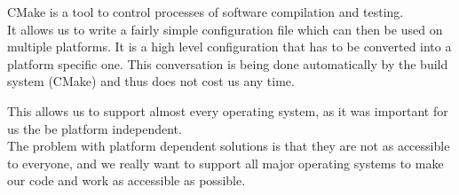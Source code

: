 CMake is a tool to control processes of software compilation and testing. \cite{cmake} \\
It allows us to write a fairly simple configuration file which can then be used on multiple platforms.
It is a high level configuration that has to be converted into a platform specific one. This conversation is being done automatically by the build system (CMake) and thus does not cost us any time.

This allows us to support almost every operating system, as it was important for us the be platform independent. \\
The problem with platform dependent solutions is that they are not as accessible to everyone, and we really want to support all major operating systems to make our code and work as accessible as possible.
